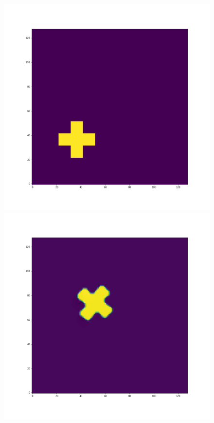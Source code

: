 \documentclass[12pt,a4paper]{article}
\begin{document}
\begin{figure}[H]
\centering
\begin{minipage}{.3\textwidth}
  \centering
  \includegraphics[width=\linewidth]{Pictures/PlusRotateTestTHINC/PlusRotateTest_t0.png}
\end{minipage}%
\begin{minipage}{.3\textwidth}
  \centering
  \includegraphics[width=\linewidth]{Pictures/PlusRotateTestTHINC/PlusRotateTest_t10.png}

\end{minipage}
\end{figure}
\end{document}
